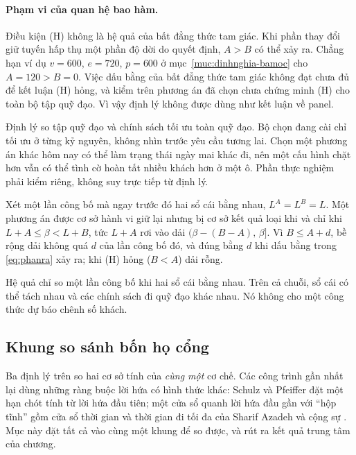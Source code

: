 \paragraph{Phạm vi của quan hệ bao hàm.}
Điều kiện (H) không là hệ quả của bất đẳng thức tam giác. Khi phần thay đổi giữ tuyến hấp thụ
một phần độ dời do quyết định, $A>B$ có thể xảy ra. Chẳng hạn ví dụ $v=600$, $e=720$,
$p=600$ ở mục~\ref{muc:dinhnghia-bamoc} cho $A=120>B=0$. Việc dấu bằng của bất đẳng thức
tam giác không đạt chưa đủ để kết luận (H) hỏng, và kiểm trên phương án đã chọn chưa chứng
minh (H) cho toàn bộ tập quỹ đạo. Vì vậy định lý không được dùng như kết luận về panel.

Định lý so tập quỹ đạo và chính sách tối ưu toàn quỹ đạo. Bộ chọn đang cài chỉ tối ưu ở từng
kỷ nguyên, không nhìn trước yêu cầu tương lai. Chọn một phương án khác hôm nay có thể làm
trạng thái ngày mai khác đi, nên một cấu hình chặt hơn vẫn có thể tình cờ hoàn tất nhiều
khách hơn ở một ô. Phần thực nghiệm phải kiểm riêng, không suy trực tiếp từ định lý.

\begin{hequa}

Xét một lần công bố mà ngay trước đó hai sổ cái bằng nhau, $L^{A} = L^{B} = L$. Một phương án được
cơ sở hành vi giữ lại nhưng bị cơ sở kết quả loại khi và chỉ khi $L + A \le \beta < L + B$, tức
$L + A$ rơi vào dải $(\beta - (B - A),\, \beta]$. Vì $B \le A + d$, bề rộng dải không quá $d$ của
lần công bố đó, và đúng bằng $d$ khi dấu bằng trong \eqref{eq:phanra} xảy ra; khi (H) hỏng
($B < A$) dải rỗng.
\end{hequa}

Hệ quả chỉ so một lần công bố khi hai sổ cái bằng nhau. Trên cả chuỗi, sổ cái có thể tách
nhau và các chính sách đi quỹ đạo khác nhau. Nó không cho một công thức dự báo chênh số khách.

\subsection{Khung so sánh bốn họ cổng}


Ba định lý trên so hai cơ sở tính của \emph{cùng một} cơ chế. Các công trình gần nhất lại dùng
những ràng buộc lời hứa có hình thức khác: Schulz và Pfeiffer \cite{schulz2026} đặt một hạn chót
tính từ lời hứa đầu tiên; một cửa sổ quanh lời hứa đầu gần với ``hộp tĩnh'' gồm cửa sổ thời gian
và thời gian đi tối đa của Sharif Azadeh và cộng sự \cite{sharifazadeh2022}. Mục này đặt tất cả
vào cùng một khung để so được, và rút ra kết quả trung tâm của chương.

